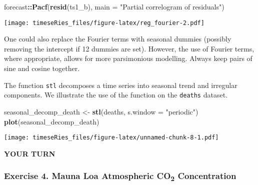 \documentclass[]{book}
\newenvironment{Shaded}{\begin{snugshade}}{\end{snugshade}}
\newcommand{\KeywordTok}[1]{\textcolor[rgb]{0.13,0.29,0.53}{\textbf{#1}}}
\newcommand{\DataTypeTok}[1]{\textcolor[rgb]{0.13,0.29,0.53}{#1}}
\newcommand{\StringTok}[1]{\textcolor[rgb]{0.31,0.60,0.02}{#1}}
\newcommand{\OperatorTok}[1]{\textcolor[rgb]{0.81,0.36,0.00}{\textbf{#1}}}
\newcommand{\NormalTok}[1]{#1}
\begin{document}
\begin{Shaded}
\begin{Highlighting}[]
\NormalTok{forecast}\OperatorTok{::}\KeywordTok{Pacf}\NormalTok{(}\KeywordTok{resid}\NormalTok{(ts1_b), }\DataTypeTok{main =} \StringTok{"Partial correlogram of residuals"}\NormalTok{)}
\end{Highlighting}
\end{Shaded}

\texttt{[image: timeseRies\_files/figure-latex/reg\_fourier-2.pdf]}

One could also replace the Fourier terms with seasonal dummies (possibly
removing the intercept if 12 dummies are set). However, the use of
Fourier terms, where appropriate, allows for more parsimonious
modelling. Always keep pairs of sine and cosine together.

The function \texttt{stl} decomposes a time series into seasonal trend
and irregular components. We illustrate the use of the function on the
\texttt{deaths} dataset.

\begin{Shaded}
\begin{Highlighting}[]
\NormalTok{seasonal_decomp_death <-}\StringTok{ }\KeywordTok{stl}\NormalTok{(deaths, }\DataTypeTok{s.window =} \StringTok{"periodic"}\NormalTok{)}
\KeywordTok{plot}\NormalTok{(seasonal_decomp_death)}
\end{Highlighting}
\end{Shaded}

\texttt{[image: timeseRies\_files/figure-latex/unnamed-chunk-8-1.pdf]}

\textbf{YOUR TURN}

\subsubsection{\texorpdfstring{Exercise 4. Mauna Loa Atmospheric
CO\textsubscript{2}
Concentration}{Exercise 4. Mauna Loa Atmospheric CO2 Concentration}}\label{exercise-4.-mauna-loa-atmospheric-co2-concentration}
\end{document}
